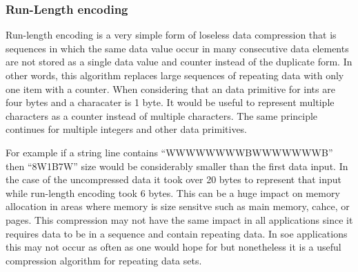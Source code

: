 \documentclass[letterpaper, 11pt]{article}
\begin{document}
\subsubsection{Run-Length encoding}
Run-length encoding is a very simple form of loseless data compression that is sequences
in which the same data value occur in many consecutive data elements are not stored as a
single data value and counter instead of the duplicate form. In other words, this algorithm
replaces large sequences of repeating data with only one item with a counter. When considering
that an data primitive for ints are four bytes and a characater is 1 byte. It would be useful
to represent multiple characters as a counter instead of multiple characters. The same principle
continues for multiple integers and other data primitives.
\par\vspace{\baselineskip}
For example if a string line contains ``WWWWWWWWBWWWWWWWB'' then ``8W1B7W'' size would be considerably
smaller than the first data input. In the case of the uncompressed data it took over 20 bytes to
represent that input while run-length encoding took 6 bytes. This can be a huge impact on memory
allocation in areas where memory is size sensitve such as main memory, cahce, or pages.
This compression may not have the same impact in all applications since it requires data to be
in a sequence and contain repeating data. In soe applications this may not occur as often as one would
hope for but nonetheless it is a useful compression algorithm for repeating data sets.
\end{document}

